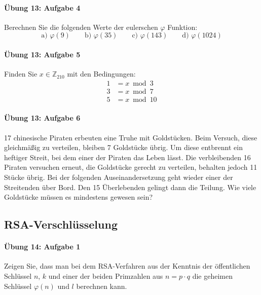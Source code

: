 \documentclass
[
  draft    = true,
  fontsize = 11pt,
  parskip  = half-,
  BCOR     = 0pt,
  DIV      = 11,
  ngerman,
  dvipsnames
]
{scrartcl}
\begin{document}
\paragraph{Übung 13: Aufgabe 4}
Berechnen Sie die folgenden Werte der eulerschen $\varphi$ Funktion:
\begin{equation*}
  \text{a) }\varphi(9)
  \qquad
  \text{b) }\varphi(35)
  \qquad
  \text{c) }\varphi(143)
  \qquad
  \text{d) }\varphi(1024)
\end{equation*}

\paragraph{Übung 13: Aufgabe 5}
Finden Sie $x\in\mathbb{Z}_{210}$ mit den Bedingungen:
\begin{equation*}
  \begin{split}
    1&=x\bmod3\\
    3&=x\bmod7\\
    5&=x\bmod10
  \end{split}
\end{equation*}

\paragraph{Übung 13: Aufgabe 6}
17 chinesische Piraten erbeuten eine Truhe mit Goldstücken. Beim Versuch,
diese gleichmäßig zu verteilen, bleiben 7 Goldstücke übrig. Um diese
entbrennt ein heftiger Streit, bei dem einer der Piraten das Leben lässt.
Die verbleibenden 16 Piraten versuchen erneut, die Goldstücke gerecht
zu verteilen, behalten jedoch 11 Stücke übrig. Bei der folgenden
Auseinandersetzung geht wieder einer der Streitenden über Bord. Den 15
Überlebenden gelingt dann die Teilung. Wie viele Goldstücke müssen es
mindestens gewesen sein?

\subsection{RSA-Verschlüsselung}

\paragraph{Übung 14: Aufgabe 1}
Zeigen Sie, dass man bei dem RSA-Verfahren aus der Kenntnis der öffentlichen
Schlüssel $n$, $k$ und einer der beiden Primzahlen aus $n=p\cdot q$ die
geheimen Schlüssel $\varphi(n)$ und $l$ berechnen kann.
\end{document}
